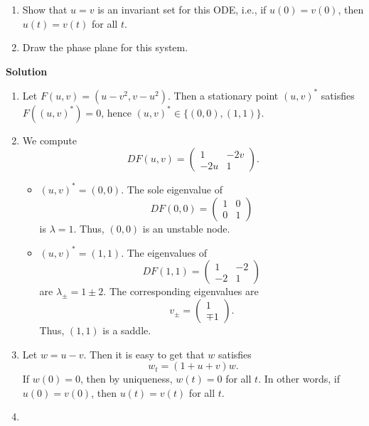 \documentclass{article}
\begin{document}
\begin{enumerate}
\begin{enumerate}
\item Show that \(u = v\) is an invariant set for this ODE, i.e., if \(u(0) = v(0)\), then \(u(t) = v(t)\) for all \(t\).

\item Draw the phase plane for this system.

\end{enumerate}

{\bf Solution}

\begin{enumerate}
\item Let \(F(u,v) = (u - v^2, v - u^2)\).  Then a stationary point \((u,v)^*\) satisfies \(F((u,v)^*) = 0\), hence \((u,v)^* \in \{(0,0), (1,1)\}\).

\item We compute
\[DF(u,v) = \left( \begin{array}{cc} 1 & -2 v \\ -2 u & 1 \end{array} \right).\]

\begin{itemize}
\item \((u,v)^* = (0,0)\).  The sole eigenvalue of
\[DF(0,0) = \left( \begin{array}{cc} 1 & 0 \\ 0 & 1 \end{array} \right)\]
is \(\lambda = 1\).  Thus, \((0,0)\) is an unstable node.

\item \((u,v)^* = (1,1)\).  The eigenvalues of
\[DF(1,1) = \left( \begin{array}{cc} 1 & -2 \\ -2 & 1 \end{array} \right)\]
are \(\lambda_{\pm} = 1 \pm 2\).  The corresponding eigenvalues are
\[v_{\pm} = \left( \begin{array}{c} 1 \\ \mp 1 \end{array} \right).\]
Thus, \((1,1)\) is a saddle.

\end{itemize}

\item Let \(w = u - v\).  Then it is easy to get that \(w\) satisfies
\[w_t = (1 + u + v) w.\]
If \(w(0) = 0\), then by uniqueness, \(w(t) = 0\) for all \(t\).  In other words, if \(u(0) = v(0)\), then \(u(t) = v(t)\) for all \(t\).

\item


\end{enumerate}
\end{enumerate}
\end{document}
